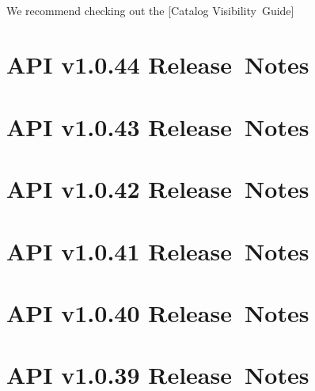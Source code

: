 \documentclass{memoir}%
\begin{document}
%
\paragraph*{}%
We recommend checking out the {[}Catalog Visibility~Guide{]}

%
\section*{API v1.0.44 Release~Notes}%
\paragraph*{}%

%
\section*{API v1.0.43 Release~Notes}%
\paragraph*{}%

%
\section*{API v1.0.42 Release~Notes}%
\paragraph*{}%

%
\section*{API v1.0.41 Release~Notes}%
\paragraph*{}%

%
\section*{API v1.0.40 Release~Notes}%
\paragraph*{}%

%
\section*{API v1.0.39 Release~Notes}%
\paragraph*{}%
\end{document}
